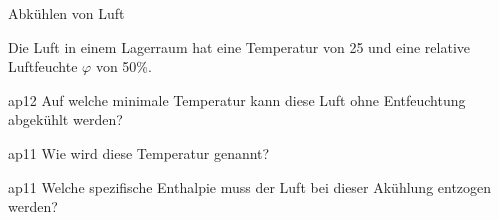 \documentclass[bsz-mkk-exam,ka]{teacher}
\begin{document}

\begin{aufgabe}{Abkühlen von Luft}
   \begin{textonly}
     Die Luft in einem Lagerraum hat eine Temperatur von
     \unit{25}{\celsius} und eine relative Luftfeuchte $\varphi$ von
     \unit{50}{\%}.
   \end{textonly}
   \begin{teilaufgabe}{ap}{1}{2}
     Auf welche minimale Temperatur kann diese Luft ohne Entfeuchtung
     abgekühlt werden?
   \end{teilaufgabe}
   \begin{loesung}
   \end{loesung}
   \begin{teilaufgabe}{ap}{1}{1}
      Wie wird diese Temperatur genannt?
   \end{teilaufgabe}
   \begin{loesung}
   \end{loesung}
   \begin{teilaufgabe}{ap}{1}{1}
     Welche spezifische Enthalpie muss der Luft bei dieser Akühlung
     entzogen werden?
   \end{teilaufgabe}
   \begin{loesung}
   \end{loesung}
\end{aufgabe}
\end{document}
